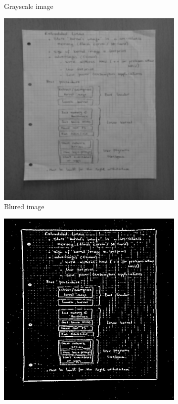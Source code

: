 \documentclass{scrartcl}
\begin{document}
\begin{figure}[!htbp]
\begin{subfigure}[b]{0.3\textwidth}
      \caption{Grayscale image}
    \end{subfigure}
    \begin{subfigure}[b]{0.3\textwidth}
      \centering
      \includegraphics[width=\textwidth]{pictures/results/reference1/blur.png}
      \caption{Blured image}
    \end{subfigure}
    \vfill
    \begin{subfigure}[b]{0.3\textwidth}
      \centering
      \includegraphics[width=\textwidth]{pictures/results/reference1/threshold.png}

\end{subfigure}
\end{figure}
\end{document}
